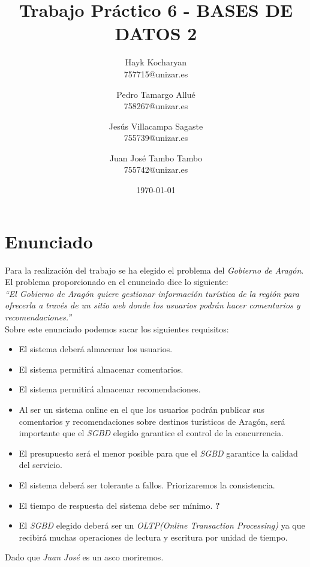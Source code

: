 \documentclass{article}
\title{Trabajo Práctico 6 - BASES DE DATOS 2}
\author{
  Hayk Kocharyan\\
  757715@unizar.es
  \and
  Pedro Tamargo Allué\\
  758267@unizar.es
  \and
  Jesús Villacampa Sagaste\\
  755739@unizar.es
  \and
  Juan José Tambo Tambo\\
  755742@unizar.es
}
\date{\today}
\begin{document}
\maketitle

%
\tableofcontents

\newpage 

\section{Enunciado}
Para la realización del trabajo se ha elegido el problema del \emph{Gobierno de Aragón}. El problema proporcionado en el enunciado dice lo siguiente:\\

\emph{``El Gobierno de Aragón quiere gestionar información turística de la región para ofrecerla a través de un sitio web donde los usuarios podrán hacer comentarios y recomendaciones.''}
\\

Sobre este enunciado podemos sacar los siguientes requisitos:
\begin{itemize}
\item El sistema deberá almacenar los usuarios.
\item El sistema permitirá almacenar comentarios.
\item El sistema permitirá almacenar recomendaciones.
\item Al ser un sistema online en el que los usuarios podrán publicar sus comentarios y recomendaciones sobre destinos turísticos de Aragón, será importante que el \emph{SGBD} elegido garantice el control de la concurrencia.
\item El presupuesto será el menor posible para que el \emph{SGBD} garantice la calidad del servicio.
\item El sistema deberá ser tolerante a fallos. Priorizaremos la consistencia.
\item El tiempo de respuesta del sistema debe ser mínimo. \textbf{?}
\item El \emph{SGBD} elegido deberá ser un \emph{OLTP(Online Transaction Processing)} ya que recibirá muchas operaciones de lectura y escritura por unidad de tiempo.
\end{itemize}

Dado que \emph{Juan José} es un asco moriremos.\\
\end{document}
